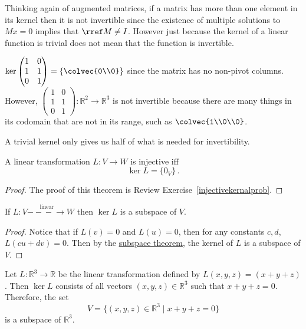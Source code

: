 Thinking again of augmented matrices, 
if a matrix has more than one element in its kernel then it is not invertible since the existence of multiple solutions to $Mx=0$ implies that $\rref M\neq I$. 
However just because the kernel of a linear function is trivial does not mean that the function is invertible. 

\begin{example}
$\ker 
\begin{pmatrix}
1&0\\
1&1\\
0&1
\end{pmatrix} =\left\{  \colvec{0\\0} \right\} $
since the matrix has no non-pivot columns. However, 
$\begin{pmatrix}
1&0\\
1&1\\
0&1
\end{pmatrix}:  \mathbb{R}^2 \to \mathbb{R}^3$
is not invertible because there are many things in its codomain that are not in its range, such as  $\colvec{1\\0\\0}$. 
\end{example}

A trivial kernel only gives us half of what is needed for invertibility.




\begin{theorem}
A linear transformation $L\colon V\rightarrow W$ is injective iff \[\ker L=\{0_V\}\, .\]
\end{theorem}

\begin{proof}
The proof of this theorem is Review Exercise~\ref{injectivekernalprob}.
\end{proof}



\begin{theorem}
If $L \colon V\stackrel{\textrm{linear}}{-\!\!\!-\!\!\!-\!\!\!\rightarrow} W$  then $\ker L$ is a subspace of $V$.
\end{theorem}

\begin{proof}
Notice that if $L(v)=0$ and $L(u)=0$, then for any constants $c,d$, $L(cu+dv)=0$.  Then by the \hyperref[subspacetheorem]{subspace theorem}, the kernel of $L$ is a subspace of $V$.
\end{proof}

\begin{example}
Let \(L \colon \mathbb{R}^3 \to \mathbb{R}\) be the linear transformation defined by \(L(x,y,z)=(x+y+z)\). Then \(\ker L\) consists of all vectors \((x,y,z) \in \mathbb{R}^3\) such that \(x+y+z=0\). Therefore, the set
\[
V=\{(x,y,z) \in \mathbb{R}^3 \mid x+y+z=0\}
\]
is a subspace of \(\mathbb{R}^3\).
\end{example}

